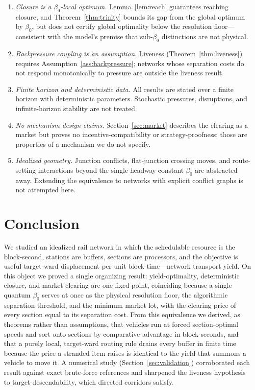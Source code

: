 \documentclass[11pt,twocolumn,a4paper]{article}
\theoremstyle{definition}
\theoremstyle{remark}
\newcommand{\blocktime}{\beta_0}
\begin{document}
\begin{enumerate}[nosep]
\item \emph{Closure is a $\blocktime$-local optimum.} Lemma~\ref{lem:reach} guarantees reaching closure, and Theorem~\ref{thm:trinity} bounds its gap from the global optimum by $\blocktime$, but does not certify global optimality below the resolution floor---consistent with the model's premise that sub-$\blocktime$ distinctions are not physical.
\item \emph{Backpressure coupling is an assumption.} Liveness (Theorem~\ref{thm:liveness}) requires Assumption~\ref{ass:backpressure}; networks whose separation costs do not respond monotonically to pressure are outside the liveness result.
\item \emph{Finite horizon and deterministic data.} All results are stated over a finite horizon with deterministic parameters. Stochastic pressures, disruptions, and infinite-horizon stability are not treated.
\item \emph{No mechanism-design claims.} Section~\ref{sec:market} describes the clearing as a market but proves no incentive-compatibility or strategy-proofness; those are properties of a mechanism we do not specify.
\item \emph{Idealized geometry.} Junction conflicts, flat-junction crossing moves, and route-setting interactions beyond the single headway constant $\blocktime$ are abstracted away. Extending the equivalence to networks with explicit conflict graphs is not attempted here.
\end{enumerate}

\section{Conclusion}

We studied an idealized rail network in which the schedulable resource is the block-second, stations are buffers, sections are processors, and the objective is useful target-ward displacement per unit block-time---network transport yield. On this object we proved a single organizing result: yield-optimality, deterministic closure, and market clearing are one fixed point, coinciding because a single quantum $\blocktime$ serves at once as the physical resolution floor, the algorithmic separation threshold, and the minimum market lot, with the clearing price of every section equal to its separation cost. From this equivalence we derived, as theorems rather than assumptions, that vehicles run at forced section-optimal speeds and sort onto sections by comparative advantage in block-seconds, and that a purely local, target-ward routing rule drains every buffer in finite time because the price a stranded item raises is identical to the yield that summons a vehicle to move it. A numerical study (Section~\ref{sec:validation}) corroborated each result against exact brute-force references and sharpened the liveness hypothesis to target-descendability, which directed corridors satisfy.
\end{document}

